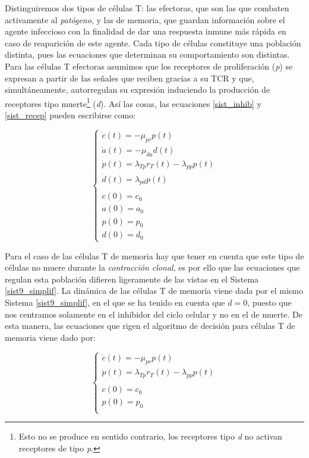Distinguiremos dos tipos de células T: las efectoras, que son las que combaten activamente al \textit{patógeno}, y las de memoria, que guardan información sobre el agente infeccioso con la finalidad de dar una respuesta inmune más rápida en caso de reaparición de este agente. Cada tipo de células constituye una población distinta, pues las ecuaciones que determinan su comportamiento son distintas. Para las células T efectoras asumimos que los receptores de proliferación (\textit{p}) se expresan a partir de las señales que reciben gracias a su TCR y que, simultáneamente, autorregulan su expresión induciendo la producción de receptores tipo muerte\footnote{Esto no se produce en sentido contrario, los receptores tipo \textit{d} no activan receptores de tipo \textit{p}.} (\textit{d}). Así las cosas, las ecuaciones \ref{sist_inhib} y \ref{sist_recep} pueden escribirse como:

\begin{equation}
	\label{sist9_simplif}
	\left\{ \begin{array}{l}
	\dot{c}(t) = -\mu_{pc}p(t) \\
	\dot{a}(t) = -\mu_{da}d(t)  \\
	\dot{p}(t) = \lambda_{Tp}r_{T}(t) - \lambda_{pp}p(t) \\
	\dot{d}(t) = \lambda_{pd}p(t) \\
	\\
	c(0)=c_0 \\
	a(0)=a_0 \\
	p(0)=p_0 \\
	d(0)=d_0 
	\end{array}
	\right.
\end{equation}

Para el caso de las células T de memoria hay que tener en cuenta que este tipo de células no muere durante la \textit{contracción clonal}, es por ello que las ecuaciones que regulan esta población difieren ligeramente de las vistas en el Sistema \ref{sist9_simplif}. La dinámica de las células T de memoria viene dada por el mismo Sistema \ref{sist9_simplif}, en el que se ha tenido en cuenta que $d=0$, puesto que nos centramos solamente en el inhibidor del ciclo celular y no en el de muerte. De esta manera, las ecuaciones que rigen el algoritmo de decisión para células T de memoria viene dado por: 

\begin{equation}
	\label{sist15_simplif}
	\left\{ \begin{array}{l}
	\dot{c}(t) = -\mu_{pc}p(t) \\
	\dot{p}(t) = \lambda_{Tp}r_{T}(t) - \lambda_{pp}p(t) \\
	\\
	c(0)=c_0 \\
	p(0)=p_0 \\
	\end{array}
	\right.
\end{equation}

